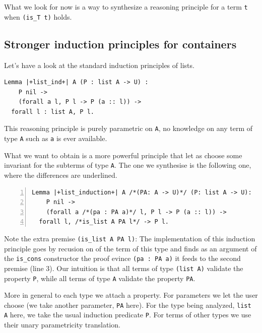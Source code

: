 \documentclass[sigplan,10pt,review]{acmart}\settopmatter{printfolios=true,printccs=false,printacmref=false}
\begin{document}
What we look for now is a way to synthesize
a reasoning principle for a term \lstinline+t+ when 
\lstinline+(is_T t)+ holds.

\subsection{Stronger induction principles for containers} %

Let's have a look at the standard induction principles of lists.

\begin{minipage}{\textwidth}\begin{lstlisting}
Lemma |+list_ind+| A (P : list A -> U) :
    P nil ->
    (forall a l, P l -> P (a :: l)) ->
  forall l : list A, P l.
\end{lstlisting}\end{minipage}

\noindent
This reasoning principle is purely parametric on \lstinline+A+, no
knowledge on any term of type \lstinline+A+ such as \lstinline+a+ is
ever available.

What we want to obtain is a more powerful principle that let as choose
some invariant for the subterms of type \lstinline+A+. The one we
synthesise is the following one, where the differences are underlined.

\begin{minipage}{\textwidth}\begin{lstlisting}[numbers=left]
Lemma |+list_induction+| A /*(PA: A -> U)*/ (P: list A -> U):
    P nil ->
    (forall a /*(pa : PA a)*/ l, P l -> P (a :: l)) ->
  forall l, /*is_list A PA l*/ -> P l.
\end{lstlisting}\end{minipage}

\noindent
Note the extra premise \lstinline+(is_list A PA l)+: The
implementation of this induction principle
goes by recusion on of the term of this type and finds
as an argument of the \lstinline+is_cons+ constructor
the proof evince \lstinline+(pa : PA a)+ it feeds to the second premise
(line 3). Our intuition is that all terms of type \lstinline+(list A)+
validate the property \lstinline+P+, while all terms of type
\lstinline+A+ validate the property \lstinline+PA+.

More in general to each type we attach a property. For parameters we
let the user choose (we take another parameter, \lstinline+PA+ here).
For the type being analyzed, \lstinline+list A+ here, we take the
usual induction predicate \lstinline+P+.
For terms of other types we use their unary parametricity translation.
\end{document}
